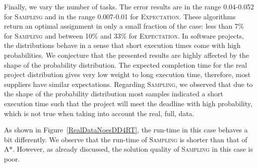 \documentclass[letterpaper]{article} %
\newcommand{\astar}{\textsc{A*}\xspace}
\newcommand{\sampling}{\textsc{Sampling}\xspace}
\newcommand{\expectation}{\textsc{Expectation}\xspace}
\begin{document}
Finally, we vary the number of tasks. %
The error results are in the range 0.04-0.052 for \sampling and in the range 0.007-0.01 for \expectation. These algorithms return an optimal assignment in only a small fraction of the case: less than 7\% for \sampling and between 10\% and 33\% for \expectation. In software projects, the distributions behave in a sense that short execution times come with high probabilities. We conjecture that the presented results are highly affected by the shape of the probability distribution. 
The expected completion time for the real project distribution gives very low weight to long execution time, therefore, most suppliers have similar expectations. Regarding \sampling, we observed that due to the shape of the probability distribution most samples indicated a short execution time such that the project will meet the deadline with high probability, which is not true when taking into account the real, full, data. 

As shown in Figure~\ref{RealDataNoesDD4RT}, the run-time in this case behaves a bit differently. We observe that the run-time of \sampling is shorter than that of \astar. However, as already discussed, the solution quality of \sampling in this case is poor. 
\end{document}
